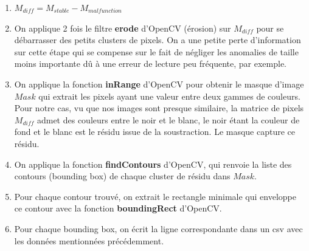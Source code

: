 \documentclass[french]{article}
\theoremstyle{mytheoremstyle}
\theoremstyle{mytheoremstyle}
\theoremstyle{myproblemstyle}
\begin{document}
        \begin{enumerate}
            \item $M_{diff} = M_{stable} - M_{malfunction}$
            \item On applique 2 fois le filtre \textbf{erode} d'OpenCV (érosion) sur $M_{diff}$ pour se débarrasser des petits clusters de pixels. On a une petite perte d'information sur cette étape qui se compense sur le fait de négliger les anomalies de taille moins importante dû à une erreur de lecture peu fréquente, par exemple.
            \item On applique la fonction \textbf{inRange} d'OpenCV pour obtenir le masque d'image $Mask$ qui extrait les pixels ayant une valeur entre deux gammes de couleurs. Pour notre cas, vu que nos images sont presque similaire, la matrice de pixels $M_{diff}$ admet des couleurs entre le noir et le blanc, le noir étant la couleur de fond et le blanc est le résidu issue de la soustraction. Le masque capture ce résidu.
            \item On applique la fonction \textbf{findContours} d'OpenCV, qui renvoie la liste des contours (bounding box) de chaque cluster de résidu dans $Mask$.
            \item Pour chaque contour trouvé, on extrait le rectangle minimale qui enveloppe ce contour avec la fonction \textbf{boundingRect} d'OpenCV.
            \item Pour chaque bounding box, on écrit la ligne correspondante dans un csv avec les données mentionnées précédemment.
        \end{enumerate}
\end{document}
